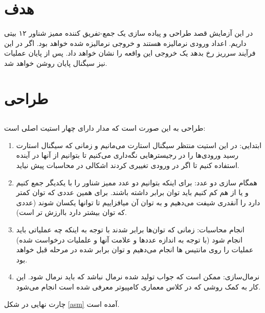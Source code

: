 \documentclass{article}
\begin{document}
\section{هدف}
در این آزمایش قصد طراحی و پیاده سازی یک جمع-تفریق کننده ممیز شناور ۱۲ بیتی داریم. اعداد ورودی نرمالیزه هستند و خروجی نرمالیزه شده خواهد بود. اگر در این فرآیند سرریز رخ بدهد یک خروجی این واقعه را نشان خواهد داد. پس از پایان عملیات نیز سیگنال پایان روشن خواهد شد.
\section{طراحی}
\subsection{}
\label{ss:ASMCHART}
طراحی به این صورت است که مدار دارای چهار استیت اصلی است:
\begin{enumerate}
\item ابتدایی:
در این استیت منتظر سیگنال استارت می‌مانیم و زمانی که سیگنال استارت رسید ورودی‌ها را در رجیسترهایی نگه‌داری می‌کنیم تا بتوانیم از آنها در آینده استفاده کنیم تا اگر در ورودی تغییری کردند اشکالی در محاسبات پیش نیاید. 

\item همگام سازی دو عدد:
برای اینکه بتوانیم دو عدد ممیز شناور را با یکدیگر جمع کنیم و یا از هم کم کنیم باید توان برابر داشته باشند. برای همین عددی که توان کمتر دارد را آنقدری شیفت می‌دهیم و به توان آن میافزاییم تا توانها یکسان شوند (عددی که توان بیشتر دارد باارزش تر است).

\item انجام محاسبات:
زمانی که توان‌ها برابر شدند با توجه به اینکه چه عملیاتی باید انجام شود (با توجه به اندازه عدد‌ها و علامت‌ آنها و علملیات درخواست شده) عملیات را روی مانتیس ها انجام می‌دهیم و توان برابر شده در مرحله قبل خواهد بود.

\item نرمال‌سازی:
ممکن است که جواب تولید شده نرمال نباشد که باید نرمال شود. این کار به کمک روشی که در کلاس معماری کامپیوتر معرفی شده است انجام  می‌شود.
\end{enumerate}

چارت نهایی در شکل \ref{asm} آمده است.
\end{document}
